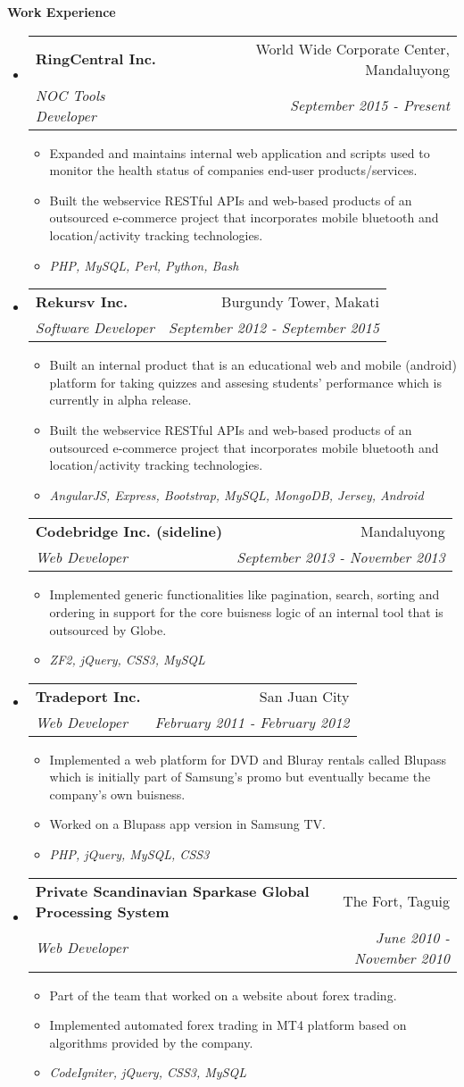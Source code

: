 \documentclass[letterpaper,11pt]{article}
\makeatletter
\newcommand{\resitem}[1]{\item #1 \vspace{-2pt}}
\newcommand{\resheading}[1]{{\large \colorbox{mygrey}{\begin{minipage}{\textwidth}{\textbf{#1 \vphantom{p\^{E}}}}\end{minipage}}}}
\newcommand{\ressubheading}[4]{
\begin{tabular*}{7.0in}{l@{\extracolsep{\fill}}r}
		\textbf{#1} & #2 \\
		\textit{#3} & \textit{#4} \\
\end{tabular*}\vspace{-6pt}}
\makeatother
\begin{document}
\resheading{Work Experience}
\begin{itemize}
\item
	\ressubheading{RingCentral Inc.}{World Wide Corporate Center, Mandaluyong}{NOC Tools Developer}{September 2015 - Present}
	\begin{itemize}
        \resitem{Expanded and maintains internal web application and scripts used to monitor the health status of companies end-user products/services.}
		\resitem{Built the webservice RESTful APIs and web-based products of an outsourced e-commerce project that incorporates mobile bluetooth and location/activity tracking technologies.}
        \resitem{\textit{PHP, MySQL, Perl, Python, Bash}}
	\end{itemize}
\item
	\ressubheading{Rekursv Inc.}{Burgundy Tower, Makati}{Software Developer}{September 2012 - September 2015}
	\begin{itemize}
        \resitem{Built an internal product that is an educational web and mobile (android) platform for taking quizzes and assesing students' performance which is currently in alpha release.}
		\resitem{Built the webservice RESTful APIs and web-based products of an outsourced e-commerce project that incorporates mobile bluetooth and location/activity tracking technologies.}
        \resitem{\textit{AngularJS, Express, Bootstrap, MySQL, MongoDB, Jersey, Android}}
	\end{itemize}
    \ressubheading{Codebridge Inc. (sideline)}{Mandaluyong}{Web Developer}{September 2013 - November 2013}
	\begin{itemize}
		\resitem{Implemented generic functionalities like pagination, search, sorting and ordering in support for the core buisness logic of an internal tool that is outsourced by Globe.}
        \resitem{\textit{ZF2, jQuery, CSS3, MySQL}}
	\end{itemize}
\item
	\ressubheading{Tradeport Inc.}{San Juan City}{Web Developer}{February 2011 - February 2012}
	\begin{itemize}
		\resitem{Implemented a web platform for DVD and Bluray rentals called Blupass which is initially part of Samsung's promo but eventually became the company's own buisness.}
		\resitem{Worked on a Blupass app version in Samsung TV.}
        \resitem{\textit{PHP, jQuery, MySQL, CSS3}}
	\end{itemize}
\item
	\ressubheading{Private Scandinavian Sparkase Global Processing System}{The Fort, Taguig}{Web Developer}{June 2010 - November 2010}
	\begin{itemize}
		\resitem{Part of the team that worked on a website about forex trading.}
		\resitem{Implemented automated forex trading in MT4 platform based on algorithms provided by the company.}
        \resitem{\textit{CodeIgniter, jQuery, CSS3, MySQL}}
	\end{itemize}
\end{itemize}
\end{document}
